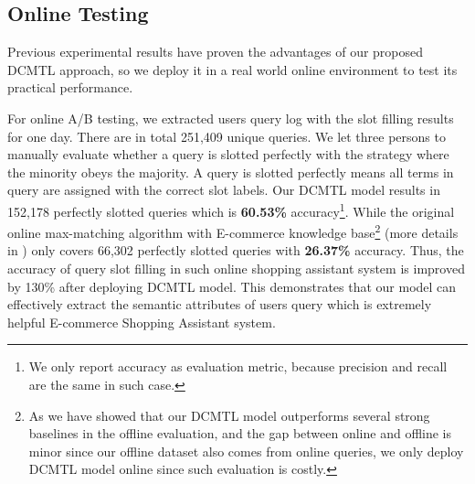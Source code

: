 
\subsection{Online Testing}
\label{sec:case_study}
Previous experimental results have proven the advantages of
our proposed DCMTL approach, so we deploy it in a real
world online environment to test its practical performance.

For online A/B testing, we extracted users query log with the slot filling results for one day. There are in total 251,409 unique queries.
We let three persons to manually evaluate whether a query is slotted perfectly with the strategy where the minority obeys the majority.
A query is slotted perfectly means all terms in query are assigned with the correct slot labels.
Our DCMTL model results in 152,178 perfectly slotted queries which is \textbf{60.53\%} accuracy\footnote{We only report accuracy as evaluation metric, because precision and recall are the same in such case.}.
While the original online max-matching algorithm with E-commerce knowledge base\footnote{As we have showed that our DCMTL model outperforms several strong baselines in the offline evaluation, and the gap between online and offline is minor since our offline dataset also comes from online queries, 
we only deploy DCMTL model online since such evaluation is costly.} 
(more details in )
only covers 66,302 perfectly slotted queries with \textbf{26.37\%} accuracy.
Thus, 
the accuracy of query slot filling in such online shopping assistant 
system is improved by 130\% after deploying DCMTL model.
This demonstrates that our model can effectively
extract the semantic attributes of users query which is extremely helpful E-commerce Shopping Assistant system.

